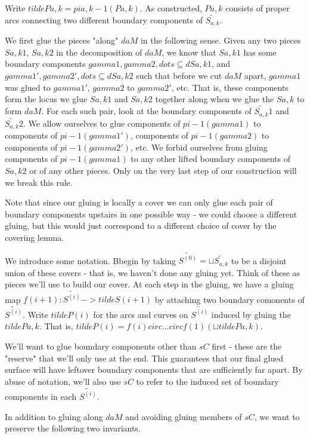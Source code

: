 \documentclass[12pt]{amsart}
\theoremstyle{definition}
\theoremstyle{remark}
\newcommand{\cin}{\subseteq}
\begin{document}
Write $tildePa,k=pia,k-1(Pa,k)$. As constructed, $Pa,k$ consists of proper arcs
connecting two different boundary components of $\widetilde{S_{a,k}}$.

We first glue the pieces "along" $daM$ in the following sense. Given any two
pieces $Sa,k1$, $Sa,k2$ in the decomposition of $daM$, we know that $Sa,k1$ has
some boundary components $gamma1,gamma2,dots \cin dSa,k1$, and
$gamma1',gamma2',dots \cin dSa,k2$ such that before we cut $daM$ apart, $gamma1$
was glued to $gamma1'$, $gamma2$ to $gamma2'$, etc.  That is, these components
form the locus we glue $Sa,k1$ and $Sa,k2$ together along when we glue the
$Sa,k$ to form $daM$.  For each such pair, look at the boundary components of
$\widetilde{S_{a,k}}1$ and $\widetilde{S_{a,k}}2$.  We allow ourselves to glue components of
$pi-1(gamma1)$ to components of $pi-1(gamma1')$, components of $pi-1(gamma2)$
to components of $pi-1(gamma2')$, etc. We forbid ourselves from gluing
components of $pi-1(gamma1)$ to any other lifted boundary components of $Sa,k2$
or of any other pieces. Only on the very last step of our construction will we
break this rule.

Note that since our gluing is locally a cover we can only glue each pair of
boundary components upstairs in one possible way - we could choose a different
gluing, but this would just correspond to a different choice of cover by the
covering lemma.

We introduce some notation. Bbegin by taking $\widetilde{S^{(0)}} = \sqcup \widetilde{S_{a,k}}$ to
be a disjoint union of these covers - that is, we haven't done any gluing yet.
Think of these as pieces we'll use to build our cover. At each step in the
gluing, we have a gluing map $f(i+1) : \widetilde{S^{(i)}} -> tildeS(i+1)$ by attaching
two boundary comonents of $\widetilde{S^{(i)}}$. Write $tildeP(i)$ for the arcs and
curves on $\widetilde{S^{(i)}}$ induced by gluing the $tildePa,k$.  That is, $tildeP(i)
= f(i) circ ...  circ f(1) (\sqcup tildePa,k)$.

We'll want to glue boundary components other than $sC$ first - these are the
"reserve" that we'll only use at the end. This guarantees that our final glued
surface will have leftover boundary components that are sufficiently far apart.
By abuse of notation, we'll also use $sC$ to refer to the induced set of
boundary components in each $\widetilde{S^{(i)}}$.

In addition to gluing along $daM$ and avoiding gluing members of $sC$, we want
to preserve the following two invariants.
\end{document}

